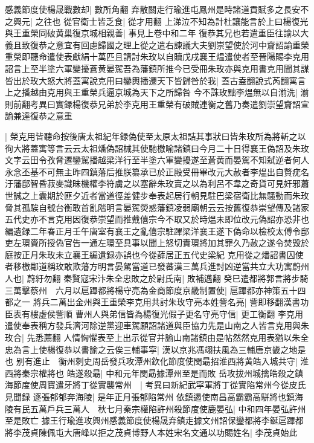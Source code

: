 感義節度使楊晟戰數却|{
	數所角翻}
弃散關走行瑜進屯鳳州是時諸道貢賦多之長安不之興元|{
	之往也}
從官衛士皆乏食|{
	從才用翻}
上涕泣不知為計杜讓能言於上曰楊復光與王重榮同破黄巢復京城相親善|{
	事見上卷中和二年}
復恭其兄也若遣重臣往諭以大義且致復恭之意宜有回慮歸國之理上從之遣右諫議大夫劉崇望使於河中齎詔諭重榮重榮即聽命遣使表獻絹十萬匹且請討朱玫以自贖戊戌襄王煴遣使者至晉陽賜李克用詔言上至半塗六軍變擾蒼黄晏駕吾為藩鎮所推今已受冊朱玫亦與克用書克用聞其謀皆出於玫大怒大將蓋寓說克用曰鑾輿播遷天下皆歸咎於我|{
	蓋古盍翻說式芮翻寓言上之播越由克用與王重榮兵逼京城為天下之所歸咎}
今不誅玫黜李煴無以自湔洗|{
	湔則前翻考異曰實録楊復恭兄弟於李克用王重榮有破賊連衡之舊乃奏遣劉崇望齎詔宣諭兼達復恭之意重}


|{
	榮克用皆聽命按後唐太祖紀年録偽使至太原太祖詰其事狀曰皆朱玫所為將斬之以徇大將蓋寓等言云云太祖燔偽詔械其使馳檄喻諸鎮曰今月二十日得襄王偽詔及朱玫文字云田令孜脅遷鑾駕播越梁洋行至半塗六軍變擾遂至蒼黄而晏駕不知弑逆者何人永念丕基不可無主昨四鎮藩后推朕纂承已於正殿受冊畢改元大赦者李煴出自贅疣名汙藩邸智昏菽麥識昧機權李符虜之以塞辭朱玫賣之以為利呂不韋之奇貨可見奸邪蕭世誠之上囊期於匪夕近者當道徑差健步奉表起居行朝見駐巴梁宿衛比無騷動而朱玫脅其孤騃自號台衡敢首亂階明言晏駕熒惑藩鎮凌弱廟朝云云按舊復恭崇望傳及諸家五代史亦不言克用因復恭崇望而推戴僖宗今不取又於時煴未即位改元偽詔亦恐非也編遺録二年春正月壬午唐室有襄王之亂僖宗駐蹕梁洋襄王遂下偽命以檢校太傅令邸吏左環賫所授偽官告一通左環至具事以聞上怒切責環將加其罪久乃赦之遂令焚毁於庭按正月朱玫未立襄王編遺録亦誤也今從薛居正五代史梁紀}
克用從之燔詔書囚使者移檄鄰道稱玫敢欺藩方明言晏駕當道已發蕃漢三萬兵進討凶逆當共立大功寓蔚州人也|{
	蔚紆勿翻}
秦賢寇宋汴朱全忠敗之於尉氏南|{
	敗補邁翻}
癸巳遣都將郭言將步騎三萬擊蔡州　六月以扈蹕都將楊守亮為金商節度京畿制置使|{
	扈蹕都亦神策五十四都之一}
將兵二萬出金州與王重榮李克用共討朱玫守亮本姓訾名亮|{
	訾即移翻漢書功臣表有樓虚侯訾順}
曹州人與弟信皆為楊復光假子更名守亮守信|{
	更工衡翻}
李克用遣使奉表稱方發兵濟河除逆黨迎車駕願詔諸道與臣協力先是山南之人皆言克用與朱玫合|{
	先悉薦翻}
人情恟懼表至上出示從官并諭山南諸鎮由是帖然然克用表猶以朱全忠為言上使楊復恭以書諭之云俟三輔事寜|{
	漢以京兆馮翊扶風為三輔唐京畿之地是也}
别有進止　衡州刺史周岳發兵攻潭州欽化節度使閔朂招淮西將黄皓入城共守|{
	淮西將秦宗權將也}
皓遂殺朂|{
	中和元年閔勗據潭州至是而敗}
岳攻拔州城擒皓殺之鎮海節度使周寶遣牙將丁從實襲常州　|{
	考異曰新紀武寜軍將丁從實陷常州今從皮氏見聞録}
逐張郁郁奔海陵|{
	是年正月張郁陷常州}
依鎮遏使南昌高霸霸高駢將也鎮海陵有民五萬戶兵三萬人　秋七月秦宗權陷許州殺節度使鹿晏弘|{
	中和四年晏弘許州至是敗亡}
據王行瑜進攻興州感義節度使楊晟弃鎮走據文州詔保鑾都將李鋋扈蹕都將李茂貞陳佩屯大唐峰以拒之茂貞博野人本姓宋名文通以功賜姓名|{
	李茂貞始此}
